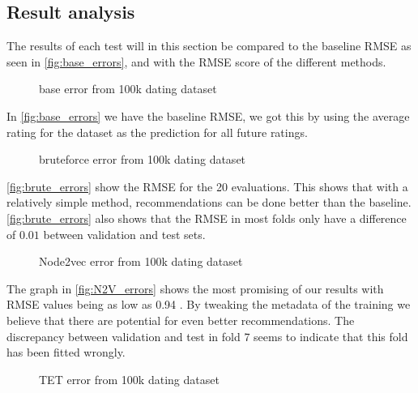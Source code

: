 \subsection{Result analysis}
The results of each test will in this section be compared to the baseline RMSE as seen in \autoref{fig:base_errors}, and with the RMSE score of the different methods.

\begin{figure}[H]
	\centering
	\begin{adjustbox}{width=0.5\textwidth}
		
	\end{adjustbox}
	\caption{base error from 100k dating dataset }
	\label{fig:base_errors}
\end{figure}

In \autoref{fig:base_errors} we have the baseline RMSE, we got this by using the average rating for the dataset as the prediction for all future ratings.

\begin{figure}[H]
	\centering
	\begin{adjustbox}{width=0.5\textwidth}
		
	\end{adjustbox}
	\caption{bruteforce error from 100k dating dataset }
	\label{fig:brute_errors}
\end{figure}

\autoref{fig:brute_errors} show the RMSE for the 20 evaluations. 
This shows that with a relatively simple method, recommendations can be done better than the baseline.
\autoref{fig:brute_errors} also shows that the RMSE in most folds only have a difference of $0.01$ between validation and test sets.

\begin{figure}[H]
	\centering
	\begin{adjustbox}{width=0.5\textwidth}
		
	\end{adjustbox}
	\caption{Node2vec error from 100k dating dataset}
	\label{fig:N2V_errors}
\end{figure}

The graph in \autoref{fig:N2V_errors} shows the most promising of our results with RMSE values being as low as 0.94 . By tweaking the metadata of the training we believe that there are potential for even better recommendations.
The discrepancy between validation and test in fold 7 seems to indicate that this fold has been fitted wrongly.


\begin{figure}[H]
	\centering
	\begin{adjustbox}{width=0.5\textwidth}
		
	\end{adjustbox}
	\caption{TET error from 100k dating dataset }
	\label{fig:tet_errors}
\end{figure}



